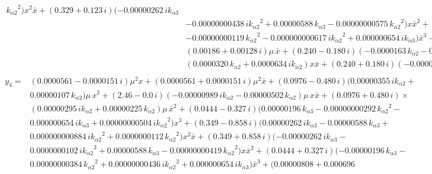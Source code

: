 \documentclass[openacc]{rsproca_new}%
\begin{document}
\begin{appendices}
\begin{align}
\begin{split}
  \,{{  k_{\alpha 2}}}^{2} ) {x}^{2}\bar x+ (  0.329+ 0.123\,i )
  ( - 0.00000262\,i{  k_{\alpha 3}}\\&- 0.00000000438\,i{{  k_{\alpha 2}}}^{2}+0.00000588\,{  k_{\alpha 3}}- 0.00000000575\,{{  k_{\alpha 2}}}^{2} ) x{\bar x}^{2
  }+ (  0.166+ 0.186\,i )  ( - 0.00000196\,{  k_{\alpha 3}}\\&-
  0.00000000119\,{{  k_{\alpha 2}}}^{2}-0.000000000617\,i{{  k_{\alpha 2}}}^{2}+
  0.000000654\,i{  k_{\alpha 3}} ) {\bar x}^{3}- (  0.00186- 0.00128\,i
  ) \mu\,x- \\&(  0.00186+ 0.00128\,i ) \mu\,\bar x+ (
  0.240- 0.180\,i )  ( - 0.0000163\,{  k_{\alpha 2}}- 0.0000314\,i{
    k_{\alpha 2}} ) {x}^{2}+ (  0.375- 0.0\,i ) \times \\&(
  0.0000320\,{  k_{\alpha 2}}+ 0.0000634\,i{  k_{\alpha 2}} ) x\bar x+(  0.240
  + 0.180\,i )  ( - 0.0000163\,{  k_{\alpha 2}}- 0.0000314\,i{
  k_{\alpha 2}} ) {\bar x}^{2},
  \end{split}
  \end{align}
  \begin{align}
  \begin{split}
  y_4=&(  0.0000561- 0.0000151\,i ) {\mu}^{2}x+ (  0.0000561
  + 0.0000151\,i ) {\mu}^{2}\bar x+ (  0.0976- 0.480\,i )
  (  0.00000355\,i{  k_{\alpha 2}}+ \\&0.00000107\,{  k_{\alpha 2}} ) \mu\,{x
  }^{2}+ (  2.46- 0.0\,i )  ( - 0.00000989\,i{  k_{\alpha 2}}-
  0.00000502\,{  k_{\alpha 2}} ) \mu\,x\bar x+ (  0.0976+ 0.480\,i
  ) \times \\&(  0.00000295\,i{  k_{\alpha 2}}+ 0.00000225\,{  k_{\alpha 2}}
  ) \mu\,{\bar x}^{2}+ (  0.0444- 0.327\,i )  (
  0.00000196\,{  k_{\alpha 3}}- 0.00000000292\,{{  k_{\alpha 2}}}^{2}- \\&0.000000654\,i
  {  k_{\alpha 3}}+ 0.00000000504\,i{{  k_{\alpha 2}}}^{2} ) {x}^{3}+ (
  0.349- 0.858\,i )  (  0.00000262\,i{  k_{\alpha 3}}- 0.00000588\,
  {  k_{\alpha 3}}+ \\&0.000000000884\,i{{  k_{\alpha 2}}}^{2}+ 0.0000000112\,{{  k_{\alpha 2}}}
  ^{2} ) {x}^{2}\bar x+ (  0.349+ 0.858\,i )  ( -
  0.00000262\,i{  k_{\alpha 3}}- \\&0.0000000102\,i{{  k_{\alpha 2}}}^{2}+ 0.00000588\,{
    k_{\alpha 3}}- 0.00000000419\,{{  k_{\alpha 2}}}^{2} ) x{\bar x}^{2}+ (
  0.0444+ 0.327\,i )  ( - 0.00000196\,{  k_{\alpha 3}}-\\&
  0.00000000384\,{{  k_{\alpha 2}}}^{2}+ 0.00000000436\,i{{  k_{\alpha 2}}}^{2}+
  0.000000654\,i{  k_{\alpha 3}} ) {\bar x}^{3}+ (  0.00000808+ 0.000696

\end{split}
\end{align}
\end{appendices}
\end{document}

